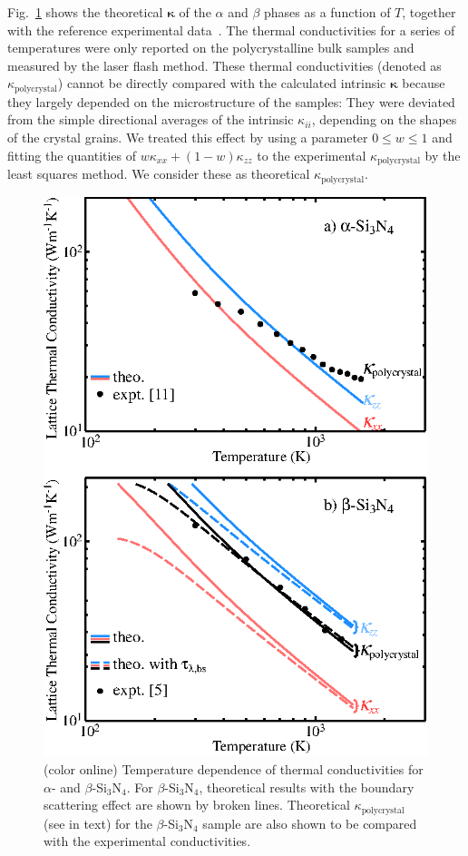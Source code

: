 \documentclass[twocolumn,amsmath,amssymb,a4paper,prb,superscriptaddress,floatfix]{revtex4-1}
\begin{document}
Fig.~\ref{fig:Fig1_338} shows the theoretical $\boldsymbol{\kappa}$ of the
$\alpha$ and $\beta$ phases as a function of $T$, together with the reference
experimental data~\cite{hirosaki,hirai}. The thermal conductivities for a
series of temperatures were only reported on the polycrystalline bulk samples
and measured by the laser flash method. 
These thermal conductivities (denoted as $\kappa_\mathrm{polycrystal}$) cannot be directly compared with the
calculated intrinsic $\boldsymbol{\kappa}$ because they 
largely depended on the microstructure of the samples: 
They were deviated from the simple directional averages of the
intrinsic $\kappa_{ii}$, depending on the shapes of the crystal
grains.  We treated this effect by using a parameter $0\le{w}\le{1}$ and
fitting the quantities of $w\kappa_{xx} + (1-w) \kappa_{zz}$ to the experimental
$\kappa_\mathrm{polycrystal}$ by the least squares method. We consider these as
theoretical $\kappa_\mathrm{polycrystal}$. 

\begin{figure}[ht]
 \begin{center}
  \includegraphics[width=0.90\linewidth]{Fig1_m1010.eps} \caption{(color
  online) Temperature dependence of thermal conductivities for $\alpha$- and
  $\beta$-Si$_3$N$_4$. For $\beta$-Si$_3$N$_4$, theoretical results with the
  boundary scattering effect are shown by broken lines. Theoretical
  $\kappa_\mathrm{polycrystal}$ 
  (see in text) for the $\beta$-Si$_3$N$_4$ sample are
  also shown to be compared with the experimental conductivities.}
  \label{fig:Fig1_338}
 \end{center}
\end{figure}
\end{document}

